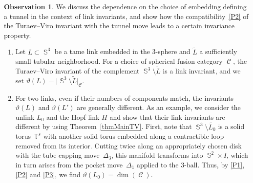 \documentclass[pdftex]{sigma}
\DeclareMathOperator{\Sp}{\mathbb{S}}
\DeclareMathOperator{\calc}{\mathcal{C}}
\numberwithin{equation}{section}
\theoremstyle{definition}
\newtheorem{Observation}[Observation]{Observation}
\begin{document}
\begin{Observation}\label{obs}
We discuss the dependence on the choice of embedding defining a tunnel in the context of link invariants, and show how the compatibility~\ref{P2} of the Turaev--Viro invariant with the tunnel move leads to a certain invariance property.
 \begin{enumerate}\itemsep=0pt
 \item Let $L \subset \Sp^3$ be a tame link embedded in the 3-sphere and $\widetilde{L}$ a sufficiently small tubular neighborhood. For a choice of spherical fusion category $\calc$, the Turaev--Viro invariant of the complement $\Sp^3 \setminus \widetilde{L}$ is a link invariant, and we set $\vartheta(L) = \bigl|\Sp^3 \setminus \widetilde{L}\bigr|_{\calc}$.
 \item For two links, even if their numbers of components match, the invariants $\vartheta(L)$ and $\vartheta(L')$ are generally different. As an example, we consider the unlink $L_0$ and the Hopf link $H$ and show that their link invariants are different by using Theorem~\ref{thmMainTV}. First, note that $\Sp^3 \setminus \widetilde{L_0}$ is a solid torus~$\mathbb{T}^s$ with another solid torus embedded along a contractible loop removed from its interior. Cutting twice along an appropriately chosen disk with the tube-capping move~$\Delta_3$, this manifold transforms into $\Sp^2 \times I$, which in turn arises from the pocket move~$\Delta_1$ applied to the 3-ball. Thus, by \ref{P1}, \ref{P2} and \ref{P3}, we find $\vartheta(L_0) = \dim(\calc)$.


\end{enumerate}
\end{Observation}
\end{document}
